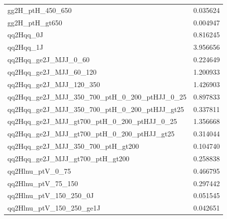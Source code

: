 \begin{table}[htbp]
{\begin{tabular}{lS}
                gg2H\_ptH\_450\_650                                    & 0.035624                                     \\
                gg2H\_ptH\_gt650                                       & 0.004947                                     \\
                qq2Hqq\_0J                                             & 0.816245                                     \\
                qq2Hqq\_1J                                             & 3.956656                                     \\
                qq2Hqq\_ge2J\_MJJ\_0\_60                               & 0.224649                                     \\
                qq2Hqq\_ge2J\_MJJ\_60\_120                             & 1.200933                                     \\
                qq2Hqq\_ge2J\_MJJ\_120\_350                            & 1.426903                                     \\
                qq2Hqq\_ge2J\_MJJ\_350\_700\_ptH\_0\_200\_ptHJJ\_0\_25 & 0.897833                                     \\
                qq2Hqq\_ge2J\_MJJ\_350\_700\_ptH\_0\_200\_ptHJJ\_gt25  & 0.337811                                     \\
                qq2Hqq\_ge2J\_MJJ\_gt700\_ptH\_0\_200\_ptHJJ\_0\_25    & 1.356668                                     \\
                qq2Hqq\_ge2J\_MJJ\_gt700\_ptH\_0\_200\_ptHJJ\_gt25     & 0.314044                                     \\
                qq2Hqq\_ge2J\_MJJ\_350\_700\_ptH\_gt200                & 0.104740                                     \\
                qq2Hqq\_ge2J\_MJJ\_gt700\_ptH\_gt200                   & 0.258838                                     \\
                qq2Hlnu\_ptV\_0\_75                                    & 0.466795                                     \\
                qq2Hlnu\_ptV\_75\_150                                  & 0.297442                                     \\
                qq2Hlnu\_ptV\_150\_250\_0J                             & 0.051545                                     \\
                qq2Hlnu\_ptV\_150\_250\_ge1J                           & 0.042651                                     \\

\end{tabular}}
\end{table}
